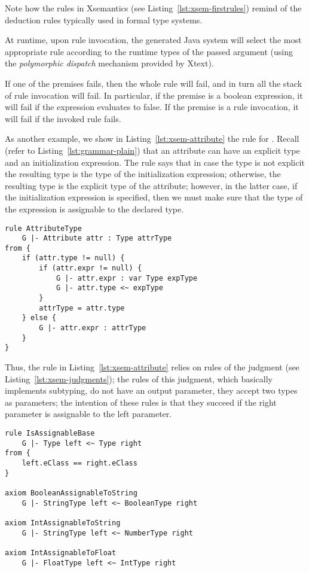 \noindent
Note how the rules in Xsemantics (see Listing~\ref{lst:xsem-firstrules}) remind
of the deduction rules typically used in formal type systems.

At runtime, upon rule invocation, the generated Java system will select the most
appropriate rule according to the runtime types of the passed argument (using
the \textit{polymorphic dispatch} mechanism provided by Xtext).

If one of the premises fails, then the whole rule will fail, and in turn all the
stack of rule invocation will fail.  In particular, if the premise is a boolean
expression, it will fail if the expression evaluates to false.  If the premise
is a rule invocation, it will fail if the invoked rule fails.

As another example, we show in Listing~\ref{lst:xsem-attribute} the rule for
.  Recall (refer to Listing~\ref{lst:grammar-plain}) that an
attribute can have an explicit type and an initialization expression. The rule
says that in case the type is not explicit the resulting type is the type of the
initialization expression; otherwise, the resulting type is the explicit type of
the attribute; however, in the latter case, if the initialization expression is
specified, then we must make sure that the type of the expression is assignable
to the declared type.

\begin{lstlisting}[language=xsemantics,float,label=lst:xsem-attribute,caption=Type
rule for \mytt{Attribute}.] 
rule AttributeType 
	G |- Attribute attr : Type attrType 
from {
	if (attr.type != null) {
		if (attr.expr != null) {
			G |- attr.expr : var Type expType
			G |- attr.type <~ expType
		}
		attrType = attr.type
	} else {
		G |- attr.expr : attrType
	}
}
\end{lstlisting}

Thus, the rule in Listing~\ref{lst:xsem-attribute} relies on rules of the
judgment  (see Listing~\ref{lst:xsem-judgments}); the rules
of this judgment, which basically implements subtyping, do not have an output
parameter, they accept two types as parameters; the intention of these rules is
that they succeed if the right parameter is assignable to the left parameter.

\begin{lstlisting}[language=xsemantics,float,label=lst:xsem-assignable,caption=Some
rules for the \mytt{isAssignable} judgment.] 
rule IsAssignableBase
	G |- Type left <~ Type right
from {
	left.eClass == right.eClass
}

axiom BooleanAssignableToString
	G |- StringType left <~ BooleanType right

axiom IntAssignableToString
	G |- StringType left <~ NumberType right

axiom IntAssignableToFloat
	G |- FloatType left <~ IntType right
\end{lstlisting}


